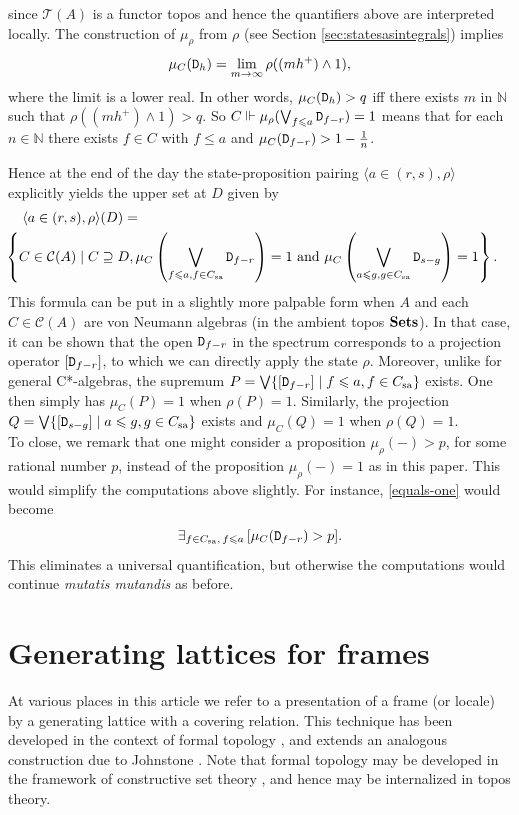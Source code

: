 \documentclass[12pt]{article}
\newcommand{\Sets}{\mbox{\textbf{Sets}}}
\newcommand{\ca}{C*-algebra} \newcommand{\jba}{JB-algebra}
\newcommand{\rh}{\rho} \newcommand{\sg}{\sigma}
\newcommand{\CA}{{\mathcal A}} \newcommand{\CB}{{\mathcal B}}
\newcommand{\alg}[1]{\ensuremath{#1}}
\newcommand{\context}{\ensuremath{\mathcal{C}}}
\newcommand{\asstopos}{\ensuremath{\mathcal{T}}}
\newcommand{\sa}{\ensuremath{_{\mathrm{sa}}}}
\newcommand{\prop}[1]{\ensuremath{\mbox{\texttt{#1}}}}
\newcommand{\field}[1]{\ensuremath{\mathbb{#1}}}
\renewcommand{\CA}{\mathcal{C}(A)}
\newcommand{\TA}{\mathcal{T}(A)}
\renewcommand{\TA}{\asstopos(\alg{A})}
\renewcommand{\CA}{\context(\alg{A})}
\begin{document}
  since $\TA$ is a functor topos and hence the quantifiers
above are interpreted locally.
The construction of $\mu_{\rh}$ from $\rh$ (see Section \ref{sec:statesasintegrals}) implies
$$\mu_C(\prop{D}_h) = \lim_{m \to \infty} \rho((mh^+)\wedge 1),$$
where the limit is a lower real. In other words, $\mu_C(\prop{D}_h)>q$ iff
there exists $m$ in $\field{N}$ such that $\rho((mh^+) \wedge 1) > q$.
So $C \Vdash \mu_{\rho}(\bigvee_{f \leqslant
a}\prop{D}_{f-r})=1$ means that
for each $n \in \field{N}$ there exists $f \in C$ with $f \leqslant a$ and
$\mu_C(\prop{D}_{f-r})>1-\frac{1}{n}$.

Hence at the end of the day the
state-proposition pairing $\langle a \in (r,s), \rho \rangle$
explicitly yields the upper set at $D$ given by
\begin{eqnarray}\label{eq:51}
\lefteqn{ \langle a \in (r,s), \rho \rangle(D) =}  \\ & &
\hspace*{-0.75cm}
\left\{C \in \CA \mid C\supseteq D,
      \mu_C  \left(\bigvee_{f\leqslant a, f\in C\sa} \prop{D}_{f-r}\right)=1 \mbox{ and }
      \mu_C  \left(\bigvee_{a\leqslant g, g\in C\sa} \prop{D}_{s-g}\right)=1 \right\}.\nonumber
\end{eqnarray}
This formula can be put in a slightly more palpable form when
$A$ and each $C\in\CA$ are von Neumann algebras (in
the ambient topos $\Sets$). In that case, it can be shown \cite{HLSSyn} that the open $\prop{D}_{f-r}$ in the spectrum
corresponds to a projection operator $[\prop{D}_{f-r}]$, to which we can directly apply the state $\rh$. Moreover, unlike for general \ca s,
 the supremum $P=\bigvee \{[\prop{D}_{f-r}] \mid f\leqslant a, f\in C\sa  \}$
  exists. One then simply has $\mu_C(P)=1$
when $\rho(P)=1$. Similarly, the projection
$Q=\bigvee \{[\prop{D}_{s-g}] \mid a\leqslant g, g\in C\sa  \}$ exists and
 $\mu_C(Q)=1$
when $\rho(Q)=1$.\\

To close, we remark that one might  consider a proposition $\mu_{\rho}(-)>p$, for some rational
number
$p$, instead of the proposition $\mu_{\rho}(-)=1$ as in this paper. This would simplify the
computations above slightly. For instance, \eqref{equals-one} would become
\[
 \exists_{f\in C\sa,\,  f \leqslant
  a}\, [ \mu_C(\prop{D}_{f-r}) > p].
\]
This eliminates a universal quantification, but otherwise the computations
would continue \emph{mutatis mutandis} as before.
\appendix
\section{Generating lattices for frames}
\label{AppA}
At various places in this article we refer to a presentation
of a frame (or locale) by a generating lattice with a covering
relation. This technique has been developed in the context of formal topology \cite{Sambin87, sambin}, and extends an
analogous construction due to Johnstone \cite{johnstone82}. Note that
formal topology may be developed in the framework of constructive set theory
\cite{aczel}, and hence may be internalized in topos theory.
\end{document}
